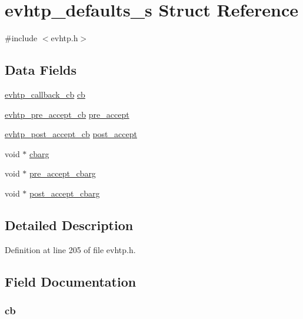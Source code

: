 \hypertarget{structevhtp__defaults__s}{
\section{evhtp\_\-defaults\_\-s Struct Reference}
\label{structevhtp__defaults__s}
}


{\ttfamily \#include $<$evhtp.h$>$}

\subsection*{Data Fields}
\begin{DoxyCompactItemize}
\item 
\hyperlink{evhtp_8h_ae907dbe36b762aa2da912cedb57268d0}{evhtp\_\-callback\_\-cb} \hyperlink{structevhtp__defaults__s_a783ee29046d4ff3e8c75f811e80fd57b}{cb}
\item 
\hyperlink{evhtp_8h_a8b649d8f816f5e4a8dc162b3bb373644}{evhtp\_\-pre\_\-accept\_\-cb} \hyperlink{structevhtp__defaults__s_a479402c7d67e5e23cb7e9a3262b6b707}{pre\_\-accept}
\item 
\hyperlink{evhtp_8h_a1fbba02d0b28d101592e5509703eddff}{evhtp\_\-post\_\-accept\_\-cb} \hyperlink{structevhtp__defaults__s_a0b645f2619a137a4e299e28c1fe208a8}{post\_\-accept}
\item 
void $\ast$ \hyperlink{structevhtp__defaults__s_aafd3d1a6343925cb274875556a6faa0e}{cbarg}
\item 
void $\ast$ \hyperlink{structevhtp__defaults__s_a0f92afb003b402ad524c0a95d13b4fb7}{pre\_\-accept\_\-cbarg}
\item 
void $\ast$ \hyperlink{structevhtp__defaults__s_a44bb35b51726d7c4e775a347b3dbc3f0}{post\_\-accept\_\-cbarg}
\end{DoxyCompactItemize}


\subsection{Detailed Description}


Definition at line 205 of file evhtp.h.



\subsection{Field Documentation}
\hypertarget{structevhtp__defaults__s_a783ee29046d4ff3e8c75f811e80fd57b}{
\subsubsection[{cb}]{ {\bf cb}}}
\label{structevhtp__defaults__s_a783ee29046d4ff3e8c75f811e80fd57b}


